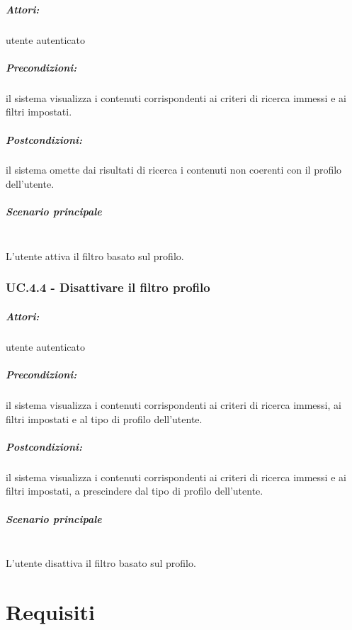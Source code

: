 \documentclass[10pt,a4paper,headinclude,footinclude,hidelinks]{scrreprt} %
\begin{document}
	\paragraph{Attori:} utente autenticato
	\paragraph{Precondizioni:} il sistema visualizza i contenuti corrispondenti ai criteri di ricerca immessi e ai filtri impostati.
	\paragraph{Postcondizioni:} il sistema omette dai risultati di ricerca i contenuti non coerenti con il profilo dell'utente.
	\paragraph{Scenario principale} \hfill \\
	L'utente attiva il filtro basato sul profilo.

	\subsection[UC.4.4]{UC.4.4 - Disattivare il filtro profilo}
	\label{sec:stage:ar:uc:4_4}
	\paragraph{Attori:} utente autenticato
	\paragraph{Precondizioni:} il sistema visualizza i contenuti corrispondenti ai criteri di ricerca immessi, ai filtri impostati e al tipo di profilo dell'utente.
	\paragraph{Postcondizioni:} il sistema visualizza i contenuti corrispondenti ai criteri di ricerca immessi e ai filtri impostati, a prescindere dal tipo di profilo dell'utente.
	\paragraph{Scenario principale} \hfill \\
	L'utente disattiva il filtro basato sul profilo.

	\chapter{Requisiti}
	\label{ch:stage:ar:requisiti}
\end{document}
